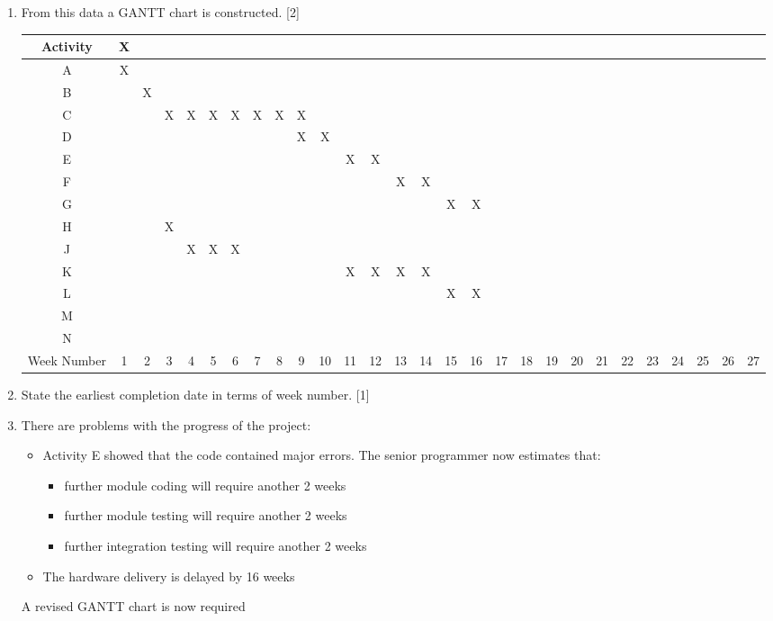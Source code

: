 \begin{enumerate}
\item From this data a GANTT chart is constructed. \hfill{}{[}2{]}
\noindent \begin{center}
\begin{tabular}{|c|c|c|c|c|c|c|c|c|c|c|c|c|c|c|c|c|c|c|c|c|c|c|c|c|c|c|c|}
\hline 
\textbf{Activity} & X &  &  &  &  &  &  &  &  &  &  &  &  &  &  &  &  &  &  &  &  &  &  &  &  &  & \tabularnewline
\hline 
A & X &  &  &  &  &  &  &  &  &  &  &  &  &  &  &  &  &  &  &  &  &  &  &  &  &  & \tabularnewline
\hline 
B &  & X &  &  &  &  &  &  &  &  &  &  &  &  &  &  &  &  &  &  &  &  &  &  &  &  & \tabularnewline
\hline 
C &  &  & X & X & X & X & X & X & X &  &  &  &  &  &  &  &  &  &  &  &  &  &  &  &  &  & \tabularnewline
\hline 
D &  &  &  &  &  &  &  &  & X & X &  &  &  &  &  &  &  &  &  &  &  &  &  &  &  &  & \tabularnewline
\hline 
E &  &  &  &  &  &  &  &  &  &  & X & X &  &  &  &  &  &  &  &  &  &  &  &  &  &  & \tabularnewline
\hline 
F &  &  &  &  &  &  &  &  &  &  &  &  & X & X &  &  &  &  &  &  &  &  &  &  &  &  & \tabularnewline
\hline 
G &  &  &  &  &  &  &  &  &  &  &  &  &  &  & X & X &  &  &  &  &  &  &  &  &  &  & \tabularnewline
\hline 
H &  &  & X &  &  &  &  &  &  &  &  &  &  &  &  &  &  &  &  &  &  &  &  &  &  &  & \tabularnewline
\hline 
J &  &  &  & X & X & X &  &  &  &  &  &  &  &  &  &  &  &  &  &  &  &  &  &  &  &  & \tabularnewline
\hline 
K &  &  &  &  &  &  &  &  &  &  & X & X & X & X &  &  &  &  &  &  &  &  &  &  &  &  & \tabularnewline
\hline 
L &  &  &  &  &  &  &  &  &  &  &  &  &  &  & X & X &  &  &  &  &  &  &  &  &  &  & \tabularnewline
\hline 
M &  &  &  &  &  &  &  &  &  &  &  &  &  &  &  &  &  &  &  &  &  &  &  &  &  &  & \tabularnewline
\hline 
N &  &  &  &  &  &  &  &  &  &  &  &  &  &  &  &  &  &  &  &  &  &  &  &  &  &  & \tabularnewline
\hline 
Week Number & 1 & 2 & 3 & 4 & 5 & 6 & 7 & 8 & 9 & 10 & 11 & 12 & 13 & 14 & 15 & 16 & 17 & 18 & 19 & 20 & 21 & 22 & 23 & 24 & 25 & 26 & 27\tabularnewline
\hline 
\end{tabular}
\par\end{center}
\item State the earliest completion date in terms of week number.\hfill{}
{[}1{]}
\item There are problems with the progress of the project: 
\begin{itemize}
\item Activity E showed that the code contained major errors. The senior
programmer now estimates that:
\begin{itemize}
\item further module coding will require another 2 weeks
\item further module testing will require another 2 weeks 
\item further integration testing will require another 2 weeks 
\end{itemize}
\item The hardware delivery is delayed by 16 weeks 
\end{itemize}
A revised GANTT chart is now required 


\end{enumerate}
